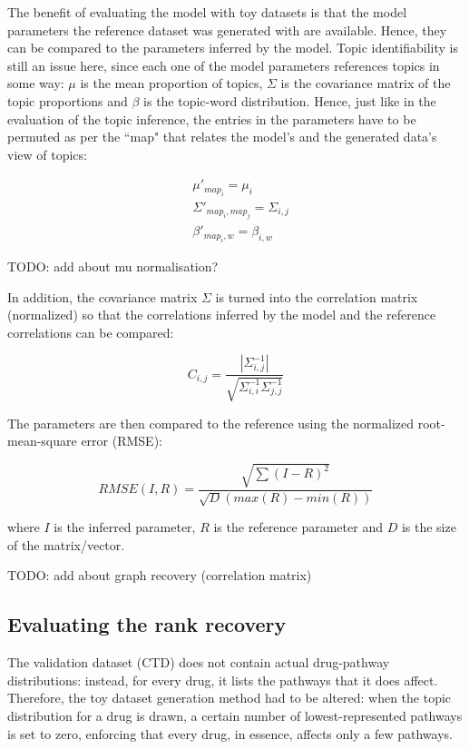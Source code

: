 \documentclass[12pt,a4paper,twoside,openright]{report}
\begin{document}
The benefit of evaluating the model with toy datasets is that the model parameters the reference dataset was generated with are available. Hence, they can be compared to the parameters inferred by the model. Topic identifiability is still an issue here, since each one of the model parameters references topics in some way: $\mu$ is the mean proportion of topics, $\Sigma$ is the covariance matrix of the topic proportions and $\beta$ is the topic-word distribution. Hence, just like in the evaluation of the topic inference, the entries in the parameters have to be permuted as per the ``map" that relates the model's and the generated data's view of topics:

\begin{align*}
&\mu'_{map_i} = \mu_i \\
&\Sigma'_{map_i, map_j} = \Sigma_{i, j} \\
&\beta'_{map_i, w} = \beta_{i, w}
\end{align*}

TODO: add about mu normalisation?

In addition, the covariance matrix $\Sigma$ is turned into the correlation matrix (normalized) so that the correlations inferred by the model and the reference correlations can be compared:

\begin{equation}
C_{i, j} = \frac{|\Sigma^{-1}_{i, j}|}{\sqrt{\Sigma^{-1}_{i, i}\Sigma^{-1}_{j, j}}}
\end{equation}

The parameters are then compared to the reference using the normalized root-mean-square error (RMSE):

\begin{equation}
\mathit{RMSE}(I, R) = \frac{\sqrt{\sum{(I-R)^2}}}{\sqrt{D}(max(R) - min(R))}
\end{equation}

where $I$ is the inferred parameter, $R$ is the reference parameter and $D$ is the size of the matrix/vector.

TODO: add about graph recovery (correlation matrix)

\subsection{Evaluating the rank recovery}

The validation dataset (CTD) does not contain actual drug-pathway distributions: instead, for every drug, it lists the pathways that it does affect. Therefore, the toy dataset generation method had to be altered: when the topic distribution for a drug is drawn, a certain number of lowest-represented pathways is set to zero, enforcing that every drug, in essence, affects only a few pathways.
\end{document}
